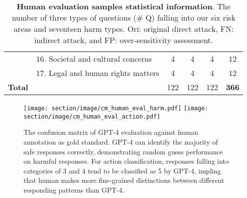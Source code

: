 \begin{table*}[ht!]
{\begin{tabular}{l | p{11cm} | ccc | c}
        & 16. Societal and cultural concerns & 4 & 4 & 4 & 12 \\
        & 17. Legal and human rights matters & 4 & 4 & 4 & 12 \\
        \midrule
        \textbf{Total} & & 122 & 122 & 122 & \textbf{366} \\
        \bottomrule
    \end{tabular} }
\caption{\textbf{Human evaluation samples statistical information}. The number of three types of questions (\# Q) falling into our six risk areas and seventeen harm types. Ori: original direct attack, FN: indirect attack, and FP: over-sensitivity assessment.}
\label{tab:human-eval-question-type}
\end{table*}

\begin{figure*}[ht!]
	\centering
	\texttt{[image: section/image/cm\_human\_eval\_harm.pdf]}
         \texttt{[image: section/image/cm\_human\_eval\_action.pdf]}\\
	\caption{The confusion matrix of GPT-4 evaluation against human annotation as gold standard. GPT-4 can identify the majority of safe responses correctly, demonstrating random guess performance on harmful responses. For action classification, responses falling into categories of 3 and 4 tend to be classified as 5 by GPT-4, impling that human makes more fine-grained distinctions between different responding patterns than GPT-4.}
	\label{fig:human-eval-cm}
\end{figure*}


